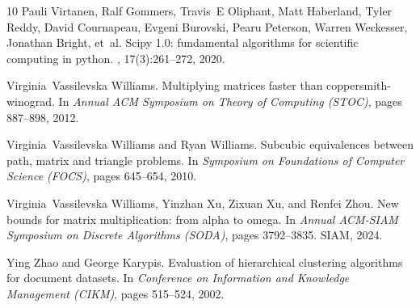 \documentclass[11pt]{article}
\begin{document}
\begin{thebibliography}{10}
Pauli Virtanen, Ralf Gommers, Travis~E Oliphant, Matt Haberland, Tyler Reddy, David Cournapeau, Evgeni Burovski, Pearu Peterson, Warren Weckesser, Jonathan Bright, et~al.
\newblock Scipy 1.0: fundamental algorithms for scientific computing in python.
, 17(3):261--272, 2020.

Virginia~Vassilevska Williams.
\newblock Multiplying matrices faster than coppersmith-winograd.
\newblock In {\em Annual ACM Symposium on Theory of Computing (STOC)}, pages 887--898, 2012.

Virginia~Vassilevska Williams and Ryan Williams.
\newblock Subcubic equivalences between path, matrix and triangle problems.
\newblock In {\em Symposium on Foundations of Computer Science (FOCS)}, pages 645--654, 2010.

Virginia~Vassilevska Williams, Yinzhan Xu, Zixuan Xu, and Renfei Zhou.
\newblock New bounds for matrix multiplication: from alpha to omega.
\newblock In {\em Annual ACM-SIAM Symposium on Discrete Algorithms (SODA)}, pages 3792--3835. SIAM, 2024.

Ying Zhao and George Karypis.
\newblock Evaluation of hierarchical clustering algorithms for document datasets.
\newblock In {\em Conference on Information and Knowledge Management (CIKM)}, pages 515--524, 2002.

\end{thebibliography}


%
%
\end{document}
